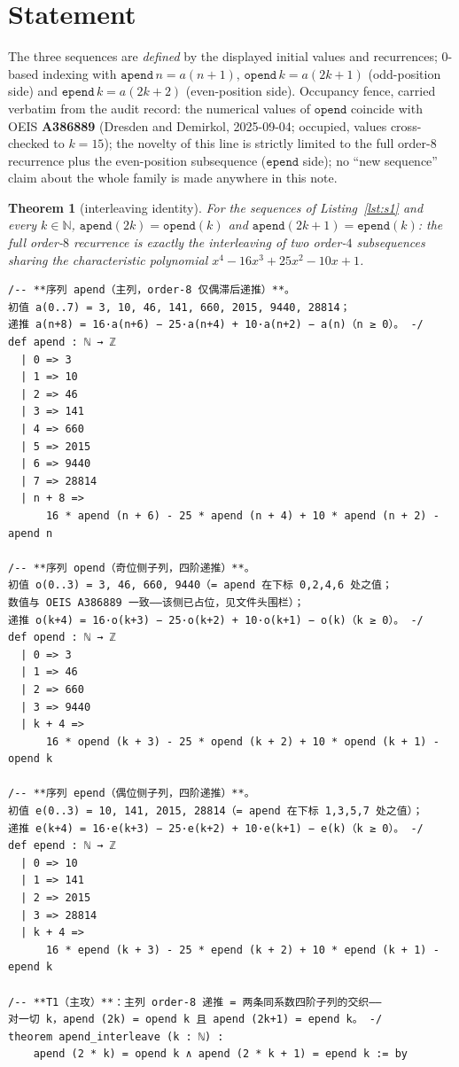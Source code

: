 \documentclass[11pt]{article}
\newtheorem{theorem}{Theorem}
\theoremstyle{definition}
\begin{document}
\section{Statement}\label{sec:statement}

The three sequences are \emph{defined} by the displayed initial values and
recurrences; $0$-based indexing with $\mathtt{apend}\,n=a(n+1)$,
$\mathtt{opend}\,k=a(2k+1)$ (odd-position side) and $\mathtt{epend}\,k=a(2k+2)$
(even-position side). Occupancy fence, carried verbatim from the audit record:
the numerical values of $\mathtt{opend}$ coincide with OEIS
\textbf{A386889} \cite{a386889} (Dresden and Demirkol, 2025-09-04; occupied,
values cross-checked to $k=15$); the novelty of this line is strictly limited
to the full order-$8$ recurrence plus the even-position subsequence
($\mathtt{epend}$ side); no ``new sequence'' claim about the whole family is
made anywhere in this note.

\begin{theorem}[interleaving identity]\label{thm:t1}
For the sequences of Listing~\ref{lst:s1} and every $k\in\mathbb{N}$,
$\mathtt{apend}(2k)=\mathtt{opend}(k)$ and
$\mathtt{apend}(2k+1)=\mathtt{epend}(k)$: the full order-$8$ recurrence is
exactly the interleaving of two order-$4$ subsequences sharing the
characteristic polynomial $x^4-16x^3+25x^2-10x+1$.
\end{theorem}

\begin{lstlisting}[caption={Frozen formal statements, verbatim lines 27--68 of
\texttt{formalized/01-pend-statements.lean} (sha256 \texttt{78bccc97}): the
three sequence definitions and Theorem~\ref{thm:t1}.},label={lst:s1}]
/-- **序列 apend（主列，order-8 仅偶滞后递推）**。
初值 a(0..7) = 3, 10, 46, 141, 660, 2015, 9440, 28814；
递推 a(n+8) = 16·a(n+6) − 25·a(n+4) + 10·a(n+2) − a(n)（n ≥ 0）。 -/
def apend : ℕ → ℤ
  | 0 => 3
  | 1 => 10
  | 2 => 46
  | 3 => 141
  | 4 => 660
  | 5 => 2015
  | 6 => 9440
  | 7 => 28814
  | n + 8 =>
      16 * apend (n + 6) - 25 * apend (n + 4) + 10 * apend (n + 2) - apend n

/-- **序列 opend（奇位侧子列，四阶递推）**。
初值 o(0..3) = 3, 46, 660, 9440（= apend 在下标 0,2,4,6 处之值；
数值与 OEIS A386889 一致——该侧已占位，见文件头围栏）；
递推 o(k+4) = 16·o(k+3) − 25·o(k+2) + 10·o(k+1) − o(k)（k ≥ 0）。 -/
def opend : ℕ → ℤ
  | 0 => 3
  | 1 => 46
  | 2 => 660
  | 3 => 9440
  | k + 4 =>
      16 * opend (k + 3) - 25 * opend (k + 2) + 10 * opend (k + 1) - opend k

/-- **序列 epend（偶位侧子列，四阶递推）**。
初值 e(0..3) = 10, 141, 2015, 28814（= apend 在下标 1,3,5,7 处之值）；
递推 e(k+4) = 16·e(k+3) − 25·e(k+2) + 10·e(k+1) − e(k)（k ≥ 0）。 -/
def epend : ℕ → ℤ
  | 0 => 10
  | 1 => 141
  | 2 => 2015
  | 3 => 28814
  | k + 4 =>
      16 * epend (k + 3) - 25 * epend (k + 2) + 10 * epend (k + 1) - epend k

/-- **T1（主攻）**：主列 order-8 递推 = 两条同系数四阶子列的交织——
对一切 k，apend (2k) = opend k 且 apend (2k+1) = epend k。 -/
theorem apend_interleave (k : ℕ) :
    apend (2 * k) = opend k ∧ apend (2 * k + 1) = epend k := by
\end{lstlisting}
\end{document}
